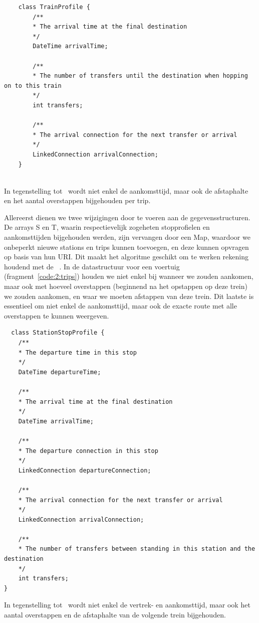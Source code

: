 \begin{listing}[htb]
	\begin{verbatim}
	class TrainProfile {
		/**
		* The arrival time at the final destination
		*/
		DateTime arrivalTime;
		
		/**
		* The number of transfers until the destination when hopping on to this train
		*/
		int transfers;
		
		/**
		* The arrival connection for the next transfer or arrival
		*/
		LinkedConnection arrivalConnection;
	}
	
	\end{verbatim}
	\caption[CSA: Gegevensstructuur voor trips]{In tegenstelling tot~\cite{strasser17} wordt niet enkel de aankomsttijd, maar ook de afstaphalte en het aantal overstappen bijgehouden per trip.}
	\label{code:2:trips}
\end{listing}

Allereerst dienen we twee wijzigingen door te voeren aan de gegevensstructuren. De arrays S en T, waarin respectievelijk zogeheten stopprofielen en aankomsttijden bijgehouden werden, zijn vervangen door een Map, waardoor we onbeperkt nieuwe stations en trips kunnen toevoegen, en deze kunnen opvragen op basis van hun URI. Dit maakt het algoritme geschikt om te werken rekening houdend met de ~\cite{colpaert17}.
In de datastructuur voor een voertuig (fragment~\ref{code:2:trips}) houden we niet enkel bij wanneer we zouden aankomen, maar ook met hoeveel overstappen (beginnend na het opstappen op deze trein) we zouden aankomen, en waar we moeten afstappen van deze trein. Dit laatste is essentieel om niet enkel de aankomsttijd, maar ook de exacte route met alle overstappen te kunnen weergeven. 

\begin{listing}[htb]
\begin{verbatim}
  class StationStopProfile {
	/**
	* The departure time in this stop
	*/
	DateTime departureTime;
	
	/**
	* The arrival time at the final destination
	*/
	DateTime arrivalTime;
	
	/**
	* The departure connection in this stop
	*/
	LinkedConnection departureConnection;
	
	/**
	* The arrival connection for the next transfer or arrival
	*/
	LinkedConnection arrivalConnection;
	
	/**
	* The number of transfers between standing in this station and the destination
	*/
	int transfers;
}
	\end{verbatim}
		\caption[CSA: Gegevensstructuur voor stopprofielen]{In tegenstelling tot~\cite{strasser17} wordt niet enkel de vertrek- en aankomsttijd, maar ook het aantal overstappen en de afstaphalte van de volgende trein bijgehouden.}
	\label{code:2:stations}
\end{listing}


